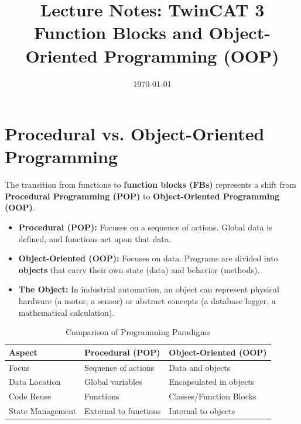 \documentclass[11pt,a4paper]{article}
\title{
    \vspace{-1cm}
    \textbf{Lecture Notes: TwinCAT 3}\\
    \Large Function Blocks and Object-Oriented Programming (OOP)
}
\author{}
\date{\today}
\begin{document}
\maketitle

\tableofcontents
\newpage

\section{Procedural vs. Object-Oriented Programming}

The transition from functions to \textbf{function blocks (FBs)} represents a shift from \textbf{Procedural Programming (POP)} to \textbf{Object-Oriented Programming (OOP)}.

\begin{itemize}[leftmargin=*]
    \item \textbf{Procedural (POP):} Focuses on a sequence of actions. Global data is defined, and functions act upon that data.
    
    \item \textbf{Object-Oriented (OOP):} Focuses on data. Programs are divided into \textbf{objects} that carry their own state (data) and behavior (methods).
    
    \item \textbf{The Object:} In industrial automation, an object can represent physical hardware (a motor, a sensor) or abstract concepts (a database logger, a mathematical calculation).
\end{itemize}

\begin{table}[h]
\centering
\begin{tabular}{@{}lll@{}}
\toprule
\textbf{Aspect} & \textbf{Procedural (POP)} & \textbf{Object-Oriented (OOP)} \\
\midrule
Focus & Sequence of actions & Data and objects \\
Data Location & Global variables & Encapsulated in objects \\
Code Reuse & Functions & Classes/Function Blocks \\
State Management & External to functions & Internal to objects \\
\bottomrule
\end{tabular}
\caption{Comparison of Programming Paradigms}
\end{table}

\end{document}
